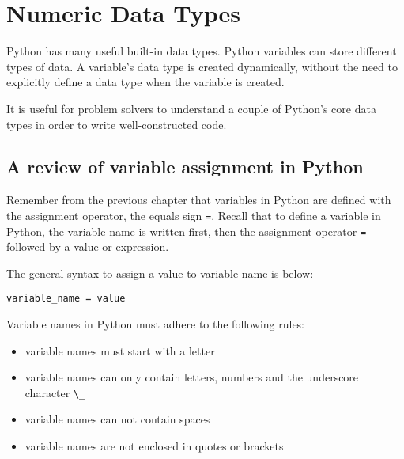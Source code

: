 \documentclass{book}
\providecommand{\tightlist}{%
      \setlength{\itemsep}{0pt}\setlength{\parskip}{0pt}}
\newcommand{\passthrough}[1]{#1}
\begin{document}
    




    
        \hypertarget{numeric-data-types}{%
\section{Numeric Data Types}\label{numeric-data-types}}
    




    
        Python has many useful built-in data types. Python variables can store
different types of data. A variable's data type is created dynamically,
without the need to explicitly define a data type when the variable is
created.

It is useful for problem solvers to understand a couple of Python's core
data types in order to write well-constructed code.
    




    
        \hypertarget{a-review-of-variable-assignment-in-python}{%
\subsection{A review of variable assignment in
Python}\label{a-review-of-variable-assignment-in-python}}

Remember from the previous chapter that variables in Python are defined
with the assignment operator, the equals sign
\passthrough{\lstinline!=!}. Recall that to define a variable in Python,
the variable name is written first, then the assignment operator
\passthrough{\lstinline!=!} followed by a value or expression.

The general syntax to assign a value to variable name is below:

\begin{lstlisting}
variable_name = value
\end{lstlisting}

Variable names in Python must adhere to the following rules:

\begin{itemize}
\tightlist
\item
  variable names must start with a letter
\item
  variable names can only contain letters, numbers and the underscore
  character \passthrough{\lstinline!\_!}
\item
  variable names can not contain spaces
\item
  variable names are not enclosed in quotes or brackets
\end{itemize}
\end{document}
